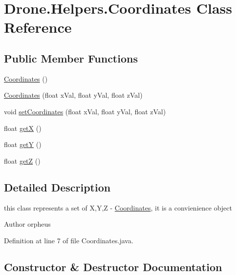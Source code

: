 \hypertarget{class_drone_1_1_helpers_1_1_coordinates}{}\section{Drone.\+Helpers.\+Coordinates Class Reference}
\label{class_drone_1_1_helpers_1_1_coordinates}
\subsection*{Public Member Functions}
\begin{DoxyCompactItemize}
\item 
\hyperlink{class_drone_1_1_helpers_1_1_coordinates_a05c9f6433cf82afb45588d0071ca678f}{Coordinates} ()
\item 
\hyperlink{class_drone_1_1_helpers_1_1_coordinates_a59caf73ce9dc36e520baf59e0cc3e4fc}{Coordinates} (float x\+Val, float y\+Val, float z\+Val)
\item 
void \hyperlink{class_drone_1_1_helpers_1_1_coordinates_abf6ace027709c11b2431dfa97eb74fa4}{set\+Coordinates} (float x\+Val, float y\+Val, float z\+Val)
\item 
float \hyperlink{class_drone_1_1_helpers_1_1_coordinates_ac717573767f0fde40e86c17d476d1ddc}{get\+X} ()
\item 
float \hyperlink{class_drone_1_1_helpers_1_1_coordinates_a9ce8bac426733f2a36e20a02c8cd36e1}{get\+Y} ()
\item 
float \hyperlink{class_drone_1_1_helpers_1_1_coordinates_a725747e253009d002ace3e2797e1ce99}{get\+Z} ()
\end{DoxyCompactItemize}


\subsection{Detailed Description}
this class represents a set of X,Y,Z -\/ \hyperlink{class_drone_1_1_helpers_1_1_coordinates}{Coordinates}, it is a convienience object \begin{DoxyAuthor}{Author}
orpheus 
\end{DoxyAuthor}


Definition at line 7 of file Coordinates.\+java.



\subsection{Constructor \& Destructor Documentation}
\hypertarget{class_drone_1_1_helpers_1_1_coordinates_a05c9f6433cf82afb45588d0071ca678f}{}
